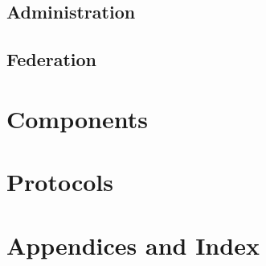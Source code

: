 



\chapter{Administration}





\chapter{Federation}





\part{Components} %







\part{Protocols} %








\part{Appendices and Index}

\appendix



